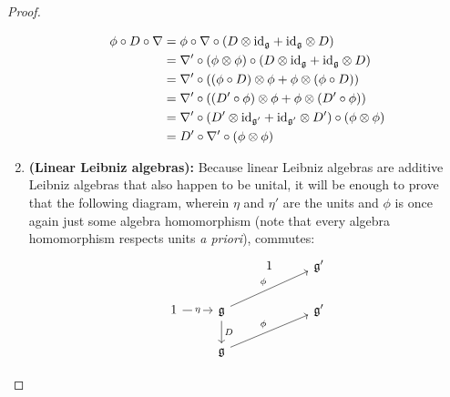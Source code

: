 \begin{proof}
\begin{enumerate}
                                    $$
                                        \begin{aligned}
                                            \phi \circ D \circ \nabla & = \phi \circ \nabla \circ \left(D \tensor \id_{\g} + \id_{\g} \tensor D\right)
                                            \\
                                            & = \nabla' \circ (\phi \tensor \phi) \circ \left(D \tensor \id_{\g} + \id_{\g} \tensor D\right)
                                            \\
                                            & = \nabla' \circ \left((\phi \circ D) \tensor \phi + \phi \tensor (\phi \circ D)\right)
                                            \\
                                            & = \nabla' \circ \left((D' \circ \phi) \tensor \phi + \phi \tensor (D' \circ \phi)\right)
                                            \\
                                            & = \nabla' \circ \left(D' \tensor \id_{\g'} + \id_{\g'} \tensor D'\right) \circ (\phi \tensor \phi)
                                            \\
                                            & = D' \circ \nabla' \circ (\phi \tensor \phi)
                                        \end{aligned}
                                    $$
                                \item \textbf{(Linear Leibniz algebras):} Because linear Leibniz algebras are additive Leibniz algebras that also happen to be unital, it will be enough to prove that the following diagram, wherein $\eta$ and $\eta'$ are the units and $\phi$ is once again just some algebra homomorphism (note that every algebra homomorphism respects units \textit{a priori}), commutes:
                                    $$
                                        \begin{tikzcd}
                                        	&& {1} & {\g'} \\
                                        	{1} & {\g} && {\g'} \\
                                        	& {\g}
                                        	\arrow["{\phi}", from=2-2, to=1-4]
                                        	\arrow["{\phi}", from=3-2, to=2-4]
                                        	\arrow["{\eta}" description, from=2-1, to=2-2]
                                        	\arrow["{D}", from=2-2, to=3-2]

\end{tikzcd}$$
\end{enumerate}
\end{proof}
